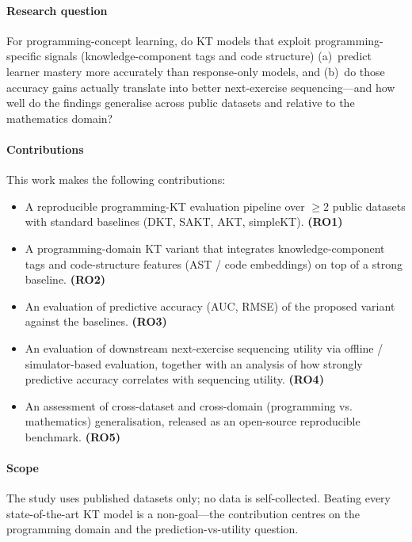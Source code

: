 \paragraph{Research question}
For programming-concept learning, do KT models that exploit
programming-specific signals (knowledge-component tags and code
structure) (a)~predict learner mastery more accurately than
response-only models, and (b)~do those accuracy gains actually translate
into better next-exercise sequencing---and how well do the findings
generalise across public datasets and relative to the mathematics
domain?

\paragraph{Contributions}
This work makes the following contributions:
\begin{itemize}
  \item A reproducible programming-KT evaluation pipeline over
        $\geq 2$ public datasets with standard baselines
        (DKT, SAKT, AKT, simpleKT). \textbf{(RO1)}
  \item A programming-domain KT variant that integrates
        knowledge-component tags and code-structure features
        (AST / code embeddings) on top of a strong baseline. \textbf{(RO2)}
  \item An evaluation of predictive accuracy (AUC, RMSE) of the proposed
        variant against the baselines. \textbf{(RO3)}
  \item An evaluation of downstream next-exercise sequencing utility via
        offline / simulator-based evaluation, together with an analysis
        of how strongly predictive accuracy correlates with sequencing
        utility. \textbf{(RO4)}
  \item An assessment of cross-dataset and cross-domain (programming vs.
        mathematics) generalisation, released as an open-source
        reproducible benchmark. \textbf{(RO5)}
\end{itemize}

\paragraph{Scope}
The study uses published datasets only; no data is self-collected.
Beating every state-of-the-art KT model is a non-goal---the contribution
centres on the programming domain and the prediction-vs-utility question.

